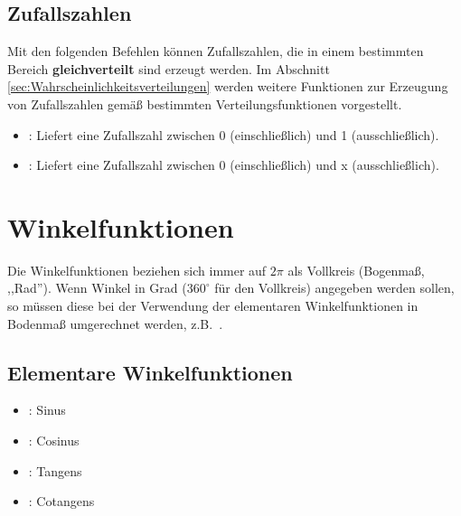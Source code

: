 \section{Zufallszahlen}

Mit den folgenden Befehlen können Zufallszahlen, die in einem bestimmten
Bereich \textbf{gleichverteilt} sind erzeugt werden. Im Abschnitt
\ref{sec:Wahrscheinlichkeitsverteilungen} werden weitere Funktionen zur
Erzeugung von Zufallszahlen gemäß bestimmten Verteilungsfunktionen vorgestellt.

\begin{itemize}

\item
{}:
Liefert eine Zufallszahl zwischen 0 (einschließlich) und 1 (ausschließlich).

\item
{}:
Liefert eine Zufallszahl zwischen 0 (einschließlich) und x (ausschließlich).

\end{itemize}





\chapter{Winkelfunktionen}\label{sec:Winkelfunktionen}

Die Winkelfunktionen beziehen sich immer auf $2\pi$ als Vollkreis (Bogenmaß, ,,Rad'').
Wenn Winkel in Grad ($360^\circ$ für den Vollkreis) angegeben werden sollen, so müssen
diese bei der Verwendung der elementaren Winkelfunktionen in Bodenmaß umgerechnet werden,
z.B.\ .



\section{Elementare Winkelfunktionen}

\begin{itemize}

\item
{}:
Sinus

\item
{}:
Cosinus

\item
{}:
Tangens

\item
{}:
Cotangens

\end{itemize}




